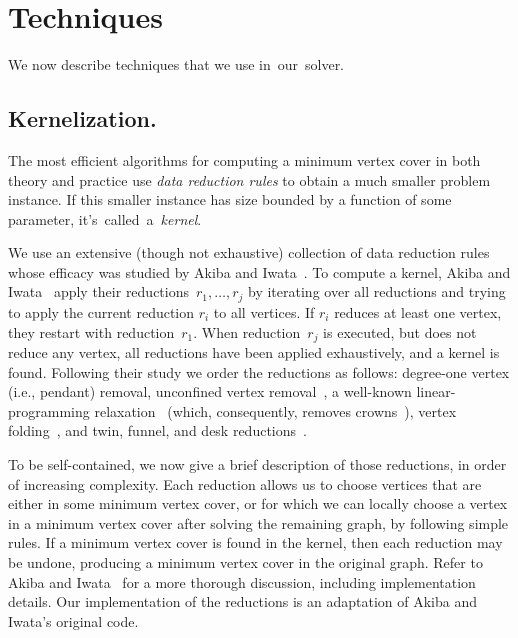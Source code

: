 \documentclass[twoside,leqno,twocolumn]{article}
\begin{document}

\section{Techniques}
\label{sec:techniques}
We now describe techniques that we use in~our~solver.
\subsection{Kernelization.}
The most efficient algorithms for computing a minimum vertex cover in both theory and practice use \emph{data reduction rules} to obtain a much smaller problem instance. If this smaller instance has size bounded by a function of some parameter, it's~called~a~\emph{kernel}. 

We use an extensive (though not exhaustive) collection of data reduction rules whose efficacy was studied by Akiba and Iwata~\cite{akiba-tcs-2016}. To compute a kernel, Akiba and Iwata~\cite{akiba-tcs-2016} apply their
reductions~$r_1, \dots, r_j$ by iterating over all reductions and trying to
apply the current reduction $r_i$ to all vertices. If $r_i$ reduces at
least one vertex, they restart with reduction~$r_1$. When reduction~$r_j$ 
is executed, but does not reduce any vertex, all reductions have been applied
exhaustively, and a kernel is found. Following their study we order the reductions
as follows: degree-one vertex (i.e., pendant) removal, unconfined vertex removal~\cite{Xiao201392}, a well-known linear-programming 
relaxation~\cite{iwata-2014,nemhauser-1975} (which, consequently, removes crowns~\cite{abu-khzam-2007}),  vertex folding~\cite{chen1999}, and twin, funnel, and desk reductions~\cite{Xiao201392}.

To be self-contained, we now give a brief description of those reductions, in order of increasing complexity. Each reduction allows us to choose vertices that are either in some minimum vertex cover, or for which we can locally choose a vertex in a minimum vertex cover after solving the remaining graph, by following simple rules. If a minimum vertex cover  is found in the kernel, then each reduction may be undone, producing a minimum vertex cover in the original graph. Refer to Akiba and Iwata~\cite{akiba-tcs-2016} for a more thorough discussion, including implementation details. Our implementation of the reductions is an adaptation of Akiba and Iwata's original code. \\
\end{document}
